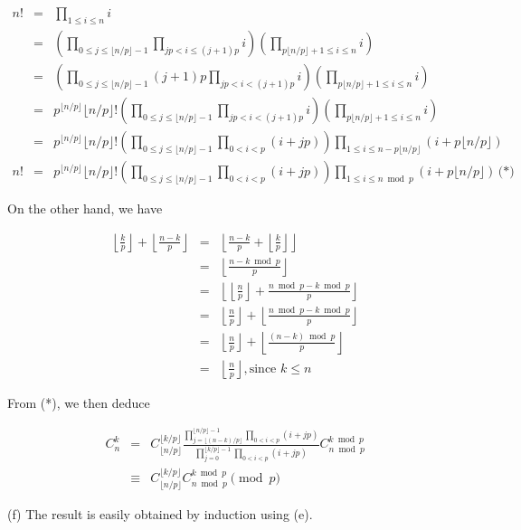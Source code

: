 \documentclass[a4paper,12pt]{article}
\newcommand{\subpar}[1]{\medskip \noindent (#1)}
\begin{document}
\begin{eqnarray*}
  n! &=& \prod_{1\le i\le n} i \\
  &=& \left( \prod_{0 \le j \le \lfloor n/p\rfloor - 1} \prod_{jp < i
    \le (j+1)p} i \right) \left( \prod_{p\lfloor n/p\rfloor + 1 \le i
    \le n} i\right) \\
  &=& \left( \prod_{0 \le j\le \lfloor n/p\rfloor - 1} (j+1)p
  \prod_{jp < i <(j+1)p} i \right)\left( \prod_{p\lfloor n/p\rfloor +
    1 \le i \le n} i\right) \\
  &=& p^{\lfloor n/p\rfloor} \lfloor n/p\rfloor!
  \left( \prod_{ 0 \le j \le \lfloor n/p\rfloor - 1} \prod_{jp < i <
    (j+1)p} i\right)\left( \prod_{p\lfloor n/p\rfloor + 1 \le i \le n}
  i\right) \\
  &=& p^{\lfloor n/p\rfloor} \lfloor n/p\rfloor! \left( \prod_{0\le j
    \le \lfloor n/p\rfloor - 1} \prod_{0 < i < p}(i+jp)\right)
  \prod_{1\le i\le n - p \lfloor n/p\rfloor} (i+p\lfloor n/p\rfloor) \\
  n!  &=& p^{\lfloor n/p\rfloor} \lfloor n/p\rfloor! \left( \prod_{0\le j
    \le \lfloor n/p\rfloor - 1} \prod_{0 < i < p}(i+jp)\right)
  \prod_{1\le i\le n \bmod p} (i+p\lfloor n/p\rfloor)\, \mbox{(*)}
\end{eqnarray*}

On the other hand, we have

\begin{eqnarray*}
  \left\lfloor \frac{k}{p}\right\rfloor + \left\lfloor
  \frac{n-k}{p}\right\rfloor &=& \left\lfloor \frac{n-k}{p} + \left\lfloor
  \frac{k}{p}\right\rfloor\right\rfloor \\
  &=& \left\lfloor \frac{n - k \bmod p}{p}\right\rfloor \\
  &=& \left\lfloor \left\lfloor \frac{n}{p}\right\rfloor + \frac{n
    \bmod p - k\bmod p}{p}\right\rfloor \\
  &=& \left\lfloor \frac{n}{p}\right\rfloor + \left\lfloor  \frac{n
    \bmod p - k\bmod p}{p}\right\rfloor \\
  &=& \left\lfloor \frac{n}{p}\right\rfloor + \left\lfloor
  \frac{(n-k)\bmod p}{p}\right\rfloor \\
  &=& \left\lfloor \frac{n}{p}\right\rfloor, \mbox{since $k \le n$}
\end{eqnarray*}

From (*), we then deduce

\begin{eqnarray*}
  C_n^k &=& C_{\lfloor n/p\rfloor}^{\lfloor k/p\rfloor}
  \frac{\prod_{j=\lfloor (n-k)/p\rfloor}^{\lfloor
      n/p\rfloor-1}\prod_{0<i<p}(i+jp)} {\prod_{j=0}^{\lfloor
      k/p\rfloor-1}\prod_{0<i<p}(i+jp)} C_{n\bmod p}^{k\bmod p} \\
  &\equiv&  C_{\lfloor n/p\rfloor}^{\lfloor k/p\rfloor} C_{n\bmod
    p}^{k\bmod p} \pmod p
\end{eqnarray*}

\subpar{f} The result is easily obtained by induction using (e).
\end{document}
